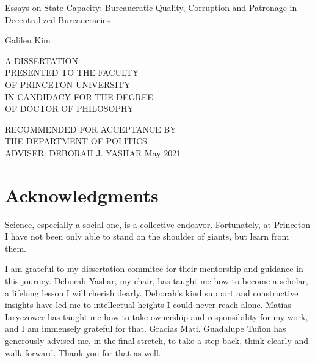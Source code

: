 \documentclass[12pt]{report}
\theoremstyle{definition}
\begin{document}
\begin{titlepage}
    \begin{center}
        \vspace*{1cm}
        
        \huge
        Essays on State Capacity: Bureaucratic Quality, Corruption and Patronage in Decentralized Bureaucracies
 
             
        \vspace{1.5cm}
        
        \LARGE
        Galileu Kim
 
        \vspace{2cm}
                
        \normalsize
        A DISSERTATION\\
        PRESENTED TO THE FACULTY\\
        OF PRINCETON UNIVERSITY\\
        IN CANDIDACY FOR THE DEGREE\\
        OF DOCTOR OF PHILOSOPHY
        
        \vspace{1cm}
        
        RECOMMENDED FOR ACCEPTANCE BY\\
        THE DEPARTMENT OF POLITICS\\
        ADVISER: DEBORAH J. YASHAR
        \vfill
        \Large
        May 2021
    \end{center}
\end{titlepage}

\section*{Acknowledgments}

\doublespacing

Science, especially a social one, is a collective endeavor. Fortunately, at Princeton I have not been only able to stand on the shoulder of giants, but learn from them. 

I am grateful to my dissertation commitee for their mentorship and guidance in this journey. Deborah Yashar, my chair, has taught me how to become a scholar, a lifelong lesson I will cherish dearly. Deborah's kind support and constructive insights have led me to intellectual heights I could never reach alone. Mat\'{i}as Iaryczower has taught me how to take ownership and responsibility for my work, and I am immensely grateful for that. Gracias Mati. Guadalupe Tu\~{n}on has generously advised me, in the final stretch, to take a step back, think clearly and walk forward. Thank you for that as well.
\end{document}
